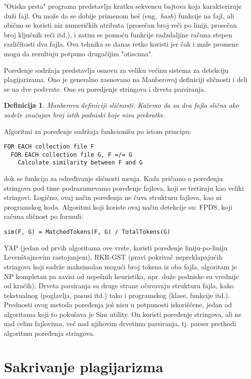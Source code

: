 \documentclass[a4paper]{article}
\newtheorem{definicija}{Definicija}[section]
\begin{document}
\par "Otiska prsta" programa predstavlja kratku sekvencu bajtova koja karakterizuje duži fajl. On može da se dobije primenom heš (eng.~{\em hash}) funkcije na fajl, ali obično se koristi niz numeričkih atributa (prosečan broj reči po liniji, prosečan broj ključnih reči itd.), i zatim se pomoću funkcije radzdaljine računa stepen različitosti dva fajla. Ova tehnika se danas retko koristi jer čak i male promene mogu da rezultuju potpuno drugačijim "otiscima".
\par Poređenje sadržaja predstavlja osnovu za veliku većinu sistema za detekciju plagijarizama. Ono je generalno zasnovano na Manberovoj definiciji sličnosti i deli se na dve podvrste. One su poredjenje stringova i drveta parsiranja.
\begin{definicija}
Manberova definiciji sličnosti: Kažemo da su dva fajla slična ako sadrže značajan broj istih podniski koje nisu prekratke.
\end{definicija}
Algoritmi za poređenje sadržaja funkcionišu po istom principu:
\begin{lstlisting}
FOR EACH collection file F
  FOR EACH collection file G, F =/= G
    Calculate similarity between F and G
\end{lstlisting}
dok se funkcija za određivanje sličnosti menja. Kada pričamo o poređenju stringova pod time podrazumevamo poređenje fajlova, koji se tretiraju kao veliki stringovi. Logično, ovaj način poređenja ne čuva strukturu fajlova, kao ni programskog koda. Algoritmi koji koriste ovaj način detekcije su: FPDS, koji računa sličnost po formuli:
\begin{lstlisting}
sim(F, G) = MatchedTokens(F, G) / TotalTokens(G)
\end{lstlisting}
YAP (jedan od prvih algoritama ove vrste, koristi poređenje liniju-po-liniju Levenštajnovim rastojanjem), RKR-GST (pravi pokrivač nepreklapajućih stringova koji sadrže maksimalan mogući broj tokena iz oba fajla, algoritam je NP kompletan pa zavisi od uspešnih heuristika, npr. duže podniske su vrednije od kraćih).
Drveta parsiranja sa druge strane očuvavaju strukturu fajla, kako tekstualnog (poglavlja, pasusi itd.) tako i programskog (klase, funkcije itd.). Prednosti ovog metoda poređenja još nisu u potpunosti iskorišćene, jedan od algoritama koji to pokušava je Sim utility. On koristi poređenje stringova, ali ne nad celim fajlovima, već nad njihovim drvetima parsiranja, tj. parser prethodi algoritmu poređenja stringova.

\section{Sakrivanje plagijarizma}
\label{sec:sakrivanje plagijarizma}
\end{document}
